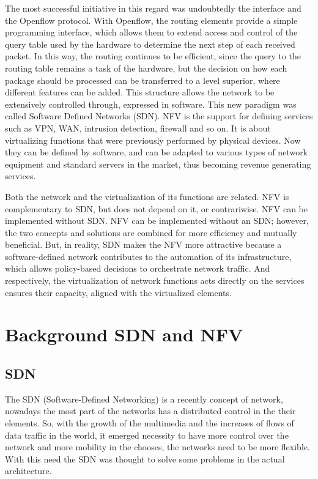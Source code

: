 \documentclass[12pt]{article}
\begin{document}
The most successful initiative in this regard was undoubtedly the interface and the Openflow protocol. With Openflow, the routing elements provide a simple programming interface, which allows them to extend access and control of the query table used by the hardware to determine the next step of each received packet. In this way, the routing continues to be efficient, since the query to the routing table remains a task of the hardware, but the decision on how each package should be processed can be transferred to a level superior, where different features can be added. This structure allows the network to be extensively controlled through, expressed in software. This new paradigm was called Software Defined Networks (SDN). NFV is the support for defining services such as VPN, WAN, intrusion detection, firewall and so on. It is about virtualizing functions that were previously performed by physical devices. Now they can be defined by software, and can be adapted to various types of network equipment and standard servers in the market, thus becoming revenue generating services.

Both the network and the virtualization of its functions are related. NFV is complementary to SDN, but does not depend on it, or contrariwise. NFV can be implemented without SDN. NFV can be implemented without an SDN; however, the two concepts and solutions are combined for more efficiency and mutually beneficial. But, in reality, SDN makes the NFV more attractive because a software-defined network contributes to the automation of its infrastructure, which allows policy-based decisions to orchestrate network traffic. And respectively, the virtualization of network functions acts directly on the services ensures their capacity, aligned with the virtualized elements.


\section{Background SDN and NFV} \label{sec:sdn}
\subsection{SDN}

The SDN (Software-Defined Networking) is a recently concept of network, nowadays the most part of the networks has a distributed control in the their elements. So, with the growth of the multimedia and the increases of flows of data traffic in the world, it emerged necessity to have more control over the network and more mobility in the chooses, the networks need to be more flexible. With this need the SDN was thought to solve some problems in the actual architecture.
\end{document}
